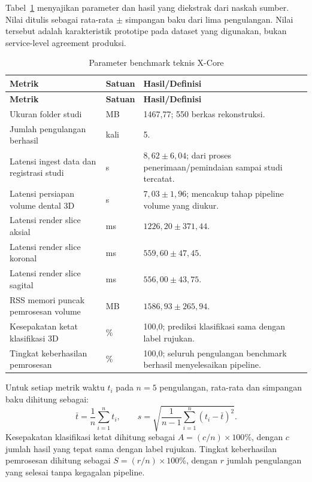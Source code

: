 \documentclass[12pt,a4paper,oneside]{report}
\begin{document}
Tabel~\ref{tab:benchmark} menyajikan parameter dan hasil yang diekstrak dari naskah sumber. Nilai ditulis sebagai rata-rata $\pm$ simpangan baku dari lima pengulangan. Nilai tersebut adalah karakteristik prototipe pada dataset yang digunakan, bukan service-level agreement produksi.

\begin{longtable}{p{5.7cm}p{2.0cm}p{4.4cm}}
\caption{Parameter benchmark teknis X-Core}\label{tab:benchmark}\\
\toprule
\textbf{Metrik} & \textbf{Satuan} & \textbf{Hasil/Definisi} \\
\midrule
\endfirsthead
\toprule
\textbf{Metrik} & \textbf{Satuan} & \textbf{Hasil/Definisi} \\
\midrule
\endhead
Ukuran folder studi & MB & 1467,77; 550 berkas rekonstruksi. \\
Jumlah pengulangan berhasil & kali & 5. \\
Latensi ingest data dan registrasi studi & s & $8{,}62 \pm 6{,}04$; dari proses penerimaan/pemindaian sampai studi tercatat. \\
Latensi persiapan volume dental 3D & s & $7{,}03 \pm 1{,}96$; mencakup tahap pipeline volume yang diukur. \\
Latensi render slice aksial & ms & $1226{,}20 \pm 371{,}44$. \\
Latensi render slice koronal & ms & $559{,}60 \pm 47{,}45$. \\
Latensi render slice sagital & ms & $556{,}00 \pm 43{,}75$. \\
RSS memori puncak pemrosesan volume & MB & $1586{,}93 \pm 265{,}94$. \\
Kesepakatan ketat klasifikasi 3D & \% & 100,0; prediksi klasifikasi sama dengan label rujukan. \\
Tingkat keberhasilan pemrosesan & \% & 100,0; seluruh pengulangan benchmark berhasil menyelesaikan pipeline. \\
\bottomrule
\end{longtable}

Untuk setiap metrik waktu $t_i$ pada $n=5$ pengulangan, rata-rata dan simpangan baku dihitung sebagai:
\begin{equation}
\bar{t}=\frac{1}{n}\sum_{i=1}^{n}t_i,\qquad s=\sqrt{\frac{1}{n-1}\sum_{i=1}^{n}(t_i-\bar{t})^2}.
\end{equation}
Kesepakatan klasifikasi ketat dihitung sebagai $A=(c/n)\times100\%$, dengan $c$ jumlah hasil yang tepat sama dengan label rujukan. Tingkat keberhasilan pemrosesan dihitung sebagai $S=(r/n)\times100\%$, dengan $r$ jumlah pengulangan yang selesai tanpa kegagalan pipeline.
\end{document}
